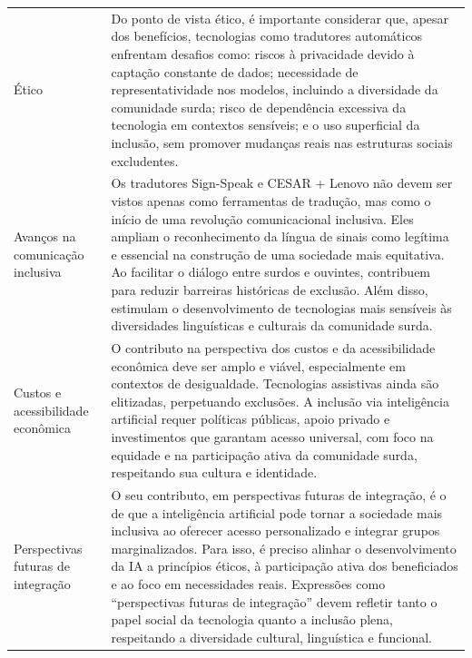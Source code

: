 \documentclass[portuguese]{textolivre}
\begin{document}
\begin{table}[htbp]
\begin{tabularx}{\textwidth}{>{\raggedright\arraybackslash}p{}
                              >{\raggedright\arraybackslash}X}
Ético &
Do ponto de vista ético, é importante considerar que, apesar dos benefícios, tecnologias como tradutores automáticos enfrentam desafios como: riscos à privacidade devido à captação constante de dados; necessidade de representatividade nos modelos, incluindo a diversidade da comunidade surda; risco de dependência excessiva da tecnologia em contextos sensíveis; e o uso superficial da inclusão, sem promover mudanças reais nas estruturas sociais excludentes.
\\[0.5em]

Avanços na comunicação inclusiva &
Os tradutores Sign-Speak e CESAR + Lenovo não devem ser vistos apenas como ferramentas de tradução, mas como o início de uma revolução comunicacional inclusiva. Eles ampliam o reconhecimento da língua de sinais como legítima e essencial na construção de uma sociedade mais equitativa. Ao facilitar o diálogo entre surdos e ouvintes, contribuem para reduzir barreiras históricas de exclusão. Além disso, estimulam o desenvolvimento de tecnologias mais sensíveis às diversidades linguísticas e culturais da comunidade surda.
\\[0.5em]

Custos e acessibilidade econômica &
O contributo na perspectiva dos custos e da acessibilidade econômica deve ser amplo e viável, especialmente em contextos de desigualdade. Tecnologias assistivas ainda são elitizadas, perpetuando exclusões. A inclusão via inteligência artificial requer políticas públicas, apoio privado e investimentos que garantam acesso universal, com foco na equidade e na participação ativa da comunidade surda, respeitando sua cultura e identidade.
\\[0.5em]

Perspectivas futuras de integração &
O seu contributo, em perspectivas futuras de integração, é o de que a inteligência artificial pode tornar a sociedade mais inclusiva ao oferecer acesso personalizado e integrar grupos marginalizados. Para isso, é preciso alinhar o desenvolvimento da IA a princípios éticos, à participação ativa dos beneficiados e ao foco em necessidades reais. Expressões como “perspectivas futuras de integração” devem refletir tanto o papel social da tecnologia quanto a inclusão plena, respeitando a diversidade cultural, linguística e funcional.
\\

\bottomrule
\end{tabularx}
\end{table}
\end{document}
